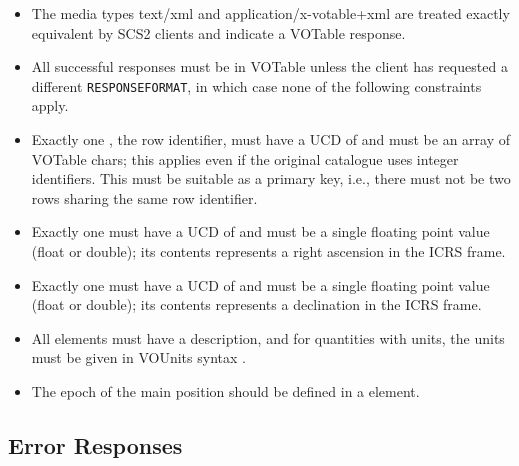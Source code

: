 \documentclass[11pt,a4paper]{ivoa}
\begin{document}
\begin{itemize}
\item The media types text/xml and application/x-votable+xml are treated
exactly equivalent by SCS2 clients and indicate a VOTable response.

\item All successful responses must be in VOTable unless the
client has requested a different \verb|RESPONSEFORMAT|,
in which case none of the following constraints apply.

\item Exactly one , the row identifier, must have a UCD of
 and must be an array of VOTable chars; this
applies even if the original catalogue uses integer identifiers.  This
must be suitable as a primary key, i.e., there must not be two rows
sharing the same row identifier.

\item Exactly one  must have a UCD of
 and must be a single floating point value
(float or double); its contents represents a right ascension in the ICRS
frame.

\item Exactly one  must have a UCD of
 and must be a single floating point value
(float or double); its contents represents a declination in the ICRS
frame.

\item All  elements must have a description, and for
quantities with units, the units must be given in VOUnits syntax
\citep{2014ivoa.spec.0523D}.

\item The epoch of the main position should be defined in a
 element.
\end{itemize}

\subsection{Error Responses}
\end{document}
